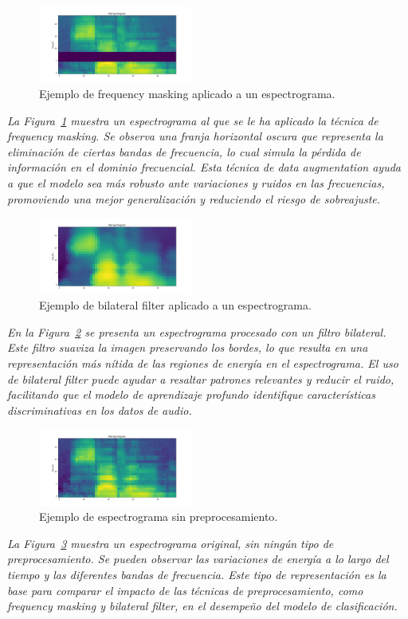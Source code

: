 \documentclass[conference]{IEEEtran}
\begin{document}
\begin{figure}[H]
\centerline{\includegraphics[width=0.45\textwidth]{sample_masking.png}}
\caption{Ejemplo de frequency masking aplicado a un espectrograma.}
\label{fig:masking}
\end{figure}
\noindent\textit{
La Figura~\ref{fig:masking} muestra un espectrograma al que se le ha aplicado la técnica de frequency masking. Se observa una franja horizontal oscura que representa la eliminación de ciertas bandas de frecuencia, lo cual simula la pérdida de información en el dominio frecuencial. Esta técnica de data augmentation ayuda a que el modelo sea más robusto ante variaciones y ruidos en las frecuencias, promoviendo una mejor generalización y reduciendo el riesgo de sobreajuste.
}

\begin{figure}[H]
\centerline{\includegraphics[width=0.45\textwidth]{sample_bilateral.png}}
\caption{Ejemplo de bilateral filter aplicado a un espectrograma.}
\label{fig:bilateral}
\end{figure}
\noindent\textit{
En la Figura~\ref{fig:bilateral} se presenta un espectrograma procesado con un filtro bilateral. Este filtro suaviza la imagen preservando los bordes, lo que resulta en una representación más nítida de las regiones de energía en el espectrograma. El uso de bilateral filter puede ayudar a resaltar patrones relevantes y reducir el ruido, facilitando que el modelo de aprendizaje profundo identifique características discriminativas en los datos de audio.
}

\begin{figure}[H]
\centerline{\includegraphics[width=0.45\textwidth]{sample.png}}
\caption{Ejemplo de espectrograma sin preprocesamiento.}
\label{fig:raw}
\end{figure}
\noindent\textit{
La Figura~\ref{fig:raw} muestra un espectrograma original, sin ningún tipo de preprocesamiento. Se pueden observar las variaciones de energía a lo largo del tiempo y las diferentes bandas de frecuencia. Este tipo de representación es la base para comparar el impacto de las técnicas de preprocesamiento, como frequency masking y bilateral filter, en el desempeño del modelo de clasificación.
}
\end{document}
